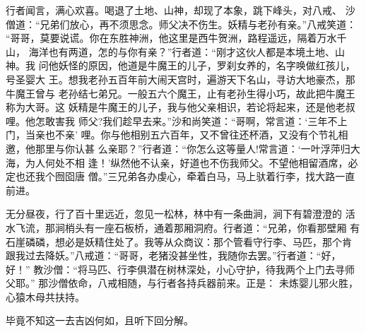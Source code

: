 行者闻言，满心欢喜。喝退了土地、山神，却现了本象，跳下峰头，对八戒、
沙僧道：“兄弟们放心，再不须思念。师父决不伤生。妖精与老孙有亲。”八戒笑道：
“哥哥，莫要说谎。你在东胜神洲，他这里是西牛贺洲，路程遥远，隔着万水千山，
海洋也有两道，怎的与你有亲？”行者道：“刚才这伙人都是本境土地、山神。我
问他妖怪的原因，他道是牛魔王的儿子，罗刹女养的，名字唤做红孩儿，号圣婴大
王。想我老孙五百年前大闹天宫时，遍游天下名山，寻访大地豪杰，那牛魔王曾与
老孙结七弟兄。一般五六个魔王，止有老孙生得小巧，故此把牛魔王称为大哥。这
妖精是牛魔王的儿子，我与他父亲相识，若论将起来，还是他老叔哩。他怎敢害我
师父?我们趁早去来。”沙和尚笑道：“哥啊，常言道：‘三年不上门，当亲也不亲’
哩。你与他相别五六百年，又不曾往还杯酒，又没有个节礼相邀，他那里与你认甚
么亲耶？”行者道：“你怎么这等量人!常言道：‘一叶浮萍归大海，为人何处不相
逢！’纵然他不认亲，好道也不伤我师父。不望他相留酒席，必定也还我个囫囵唐
僧。”三兄弟各办虔心，牵着白马，马上驮着行李，找大路一直前进。

无分昼夜，行了百十里远近，忽见一松林，林中有一条曲涧，涧下有碧澄澄的
活水飞流，那涧梢头有一座石板桥，通着那厢洞府。行者道：“兄弟，你看那壁厢
有石崖磷磷，想必是妖精住处了。我等从众商议：那个管看守行李、马匹，那个肯
跟我过去降妖。”八戒道：“哥哥，老猪没甚坐性，我随你去罢。”行者道：“好，好！”
教沙僧：“将马匹、行李俱潜在树林深处，小心守护，待我两个上门去寻师父耶。”
那沙僧依命，八戒相随，与行者各持兵器前来。正是：
未炼婴儿邪火胜，心猿木母共扶持。

毕竟不知这一去吉凶何如，且听下回分解。
